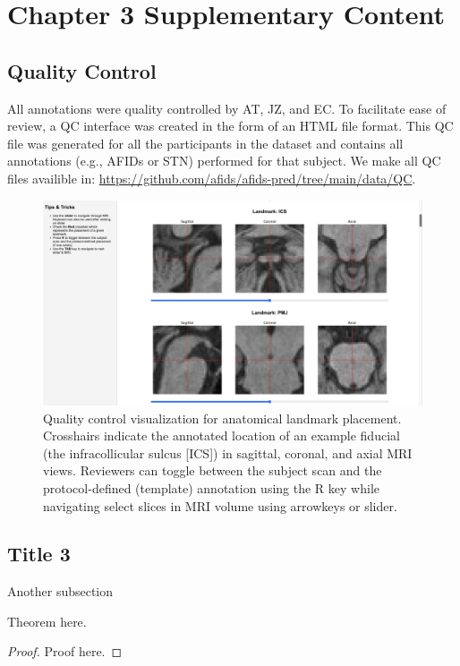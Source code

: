\chapter{Chapter 3 Supplementary Content}\label{app:ch3suppcontent}
\newpage

\newpage
\section{Quality Control}\label{app:qualitycontrol}
All annotations were quality controlled by AT, JZ, and EC. To facilitate ease of review, a QC interface was created in the form of an HTML file format. This QC file was generated for all the participants in the dataset and contains all annotations (e.g., AFIDs or STN) performed for that subject. We make all QC files availible in: \url{https://github.com/afids/afids-pred/tree/main/data/QC}.

\begin{figure}[hbt!]
    \centering
    \includegraphics[width=0.95\linewidth]{figs/figuresupQC.png}
    \caption{Quality control visualization for anatomical landmark placement. Crosshairs indicate the annotated location of an example fiducial (the infracollicular sulcus [ICS]) in sagittal, coronal, and axial MRI views. Reviewers can toggle between the subject scan and the protocol-defined (template) annotation using the R key while navigating select slices in MRI volume using arrowkeys or slider.}
    \label{fig:figuresupQC}
\end{figure}

\section{Title 3}\label{app:Chapter4}

Another subsection

\begin{theorem}
Theorem here.
\end{theorem}

\begin{proof}
    Proof here.
\end{proof}